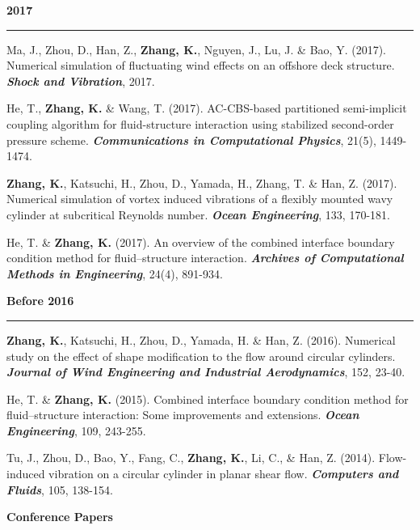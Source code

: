 \documentclass[10pt]{article}
\begin{document}
{\begin{etaremune}
 \item [] {\bf \color{Blue} 2017 \rule{14.8cm}{0.2mm}}   

  \item Ma, J., Zhou, D., Han, Z., \textbf{Zhang, K.}, Nguyen, J., Lu, J. \& Bao, Y. (2017). Numerical simulation of fluctuating wind effects on an offshore deck structure. \textit{\textbf{Shock and Vibration}}, 2017.
  \item He, T., \textbf{Zhang, K.} \& Wang, T. (2017). AC-CBS-based partitioned semi-implicit coupling algorithm for fluid-structure interaction using stabilized second-order pressure scheme. \textit{\textbf{Communications in Computational Physics}}, 21(5), 1449-1474.
  
  \item \textbf{Zhang, K.}, Katsuchi, H., Zhou, D., Yamada, H., Zhang, T. \& Han, Z. (2017). Numerical simulation of vortex induced vibrations of a flexibly mounted wavy cylinder at subcritical Reynolds number. \textit{\textbf{Ocean Engineering}}, 133, 170-181.
  
  \item He, T. \& \textbf{Zhang, K.} (2017). An overview of the combined interface boundary condition method for fluid–structure interaction. \textit{\textbf{Archives of Computational Methods in Engineering}}, 24(4), 891-934.
  
 \item [] {\bf \color{Blue} Before 2016 \rule{13.6cm}{0.2mm}}   

  \item \textbf{Zhang, K.}, Katsuchi, H., Zhou, D., Yamada, H. \& Han, Z. (2016). Numerical study on the effect of shape modification to the flow around circular cylinders. \textit{\textbf{Journal of Wind Engineering and Industrial Aerodynamics}}, 152, 23-40.  

  \item He, T. \& \textbf{Zhang, K.} (2015). Combined interface boundary condition method for fluid–structure interaction: Some improvements and extensions. \textit{\textbf{Ocean Engineering}}, 109, 243-255.
  
  \item Tu, J., Zhou, D., Bao, Y., Fang, C., \textbf{Zhang, K.}, Li, C., \& Han, Z. (2014). Flow-induced vibration on a circular cylinder in planar shear flow. \textit{\textbf{Computers and Fluids}}, 105, 138-154.

\end{etaremune}
}

\vspace{+0.1in}
{\bf \color{Blue}Conference Papers}
\end{document}
